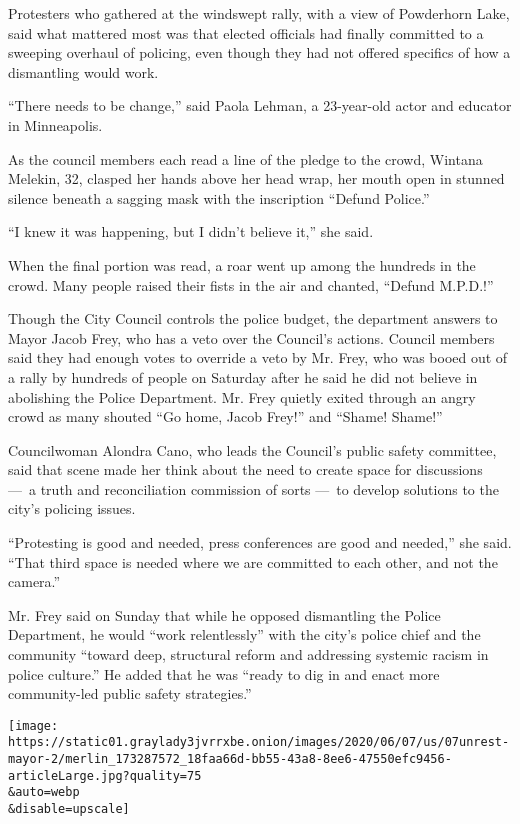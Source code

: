 Protesters who gathered at the windswept rally, with a view of
Powderhorn Lake, said what mattered most was that elected officials had
finally committed to a sweeping overhaul of policing, even though they
had not offered specifics of how a dismantling would work.

``There needs to be change,'' said Paola Lehman, a 23-year-old actor and
educator in Minneapolis.

As the council members each read a line of the pledge to the crowd,
Wintana Melekin, 32, clasped her hands above her head wrap, her mouth
open in stunned silence beneath a sagging mask with the inscription
``Defund Police.''

``I knew it was happening, but I didn't believe it,'' she said.

When the final portion was read, a roar went up among the hundreds in
the crowd. Many people raised their fists in the air and chanted,
``Defund M.P.D.!''

Though the City Council controls the police budget, the department
answers to Mayor Jacob Frey, who has a veto over the Council's actions.
Council members said they had enough votes to override a veto by Mr.
Frey, who was booed out of a rally by hundreds of people on Saturday
after he said he did not believe in abolishing the Police Department.
Mr. Frey quietly exited through an angry crowd as many shouted ``Go
home, Jacob Frey!'' and ``Shame! Shame!''

Councilwoman Alondra Cano, who leads the Council's public safety
committee, said that scene made her think about the need to create space
for discussions ---~a truth and reconciliation commission of sorts
---~to develop solutions to the city's policing issues.

``Protesting is good and needed, press conferences are good and
needed,'' she said. ``That third space is needed where we are committed
to each other, and not the camera.''

Mr. Frey said on Sunday that while he opposed dismantling the Police
Department, he would ``work relentlessly'' with the city's police chief
and the community ``toward deep, structural reform and addressing
systemic racism in police culture.'' He added that he was ``ready to dig
in and enact more community-led public safety strategies.''

\texttt{[image: https://static01.graylady3jvrrxbe.onion/images/2020/06/07/us/07unrest-mayor-2/merlin\_173287572\_18faa66d-bb55-43a8-8ee6-47550efc9456-articleLarge.jpg?quality=75\\\&auto=webp\\\&disable=upscale]}

